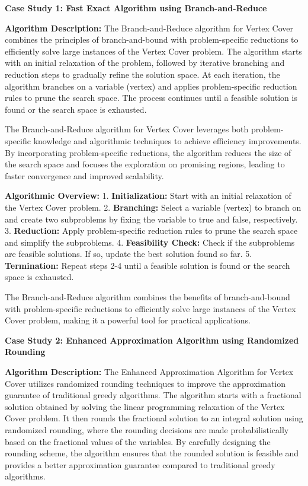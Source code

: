 \textbf{Case Study 1: Fast Exact Algorithm using Branch-and-Reduce}

\textbf{Algorithm Description:} The Branch-and-Reduce algorithm for Vertex Cover combines the principles of branch-and-bound with problem-specific reductions to efficiently solve large instances of the Vertex Cover problem. The algorithm starts with an initial relaxation of the problem, followed by iterative branching and reduction steps to gradually refine the solution space. At each iteration, the algorithm branches on a variable (vertex) and applies problem-specific reduction rules to prune the search space. The process continues until a feasible solution is found or the search space is exhausted.

The Branch-and-Reduce algorithm for Vertex Cover leverages both problem-specific knowledge and algorithmic techniques to achieve efficiency improvements. By incorporating problem-specific reductions, the algorithm reduces the size of the search space and focuses the exploration on promising regions, leading to faster convergence and improved scalability.

\textbf{Algorithmic Overview:} 
1. \textbf{Initialization:} Start with an initial relaxation of the Vertex Cover problem.
2. \textbf{Branching:} Select a variable (vertex) to branch on and create two subproblems by fixing the variable to true and false, respectively.
3. \textbf{Reduction:} Apply problem-specific reduction rules to prune the search space and simplify the subproblems.
4. \textbf{Feasibility Check:} Check if the subproblems are feasible solutions. If so, update the best solution found so far.
5. \textbf{Termination:} Repeat steps 2-4 until a feasible solution is found or the search space is exhausted.

The Branch-and-Reduce algorithm combines the benefits of branch-and-bound with problem-specific reductions to efficiently solve large instances of the Vertex Cover problem, making it a powerful tool for practical applications.



\textbf{Case Study 2: Enhanced Approximation Algorithm using Randomized Rounding}

\textbf{Algorithm Description:} The Enhanced Approximation Algorithm for Vertex Cover utilizes randomized rounding techniques to improve the approximation guarantee of traditional greedy algorithms. The algorithm starts with a fractional solution obtained by solving the linear programming relaxation of the Vertex Cover problem. It then rounds the fractional solution to an integral solution using randomized rounding, where the rounding decisions are made probabilistically based on the fractional values of the variables. By carefully designing the rounding scheme, the algorithm ensures that the rounded solution is feasible and provides a better approximation guarantee compared to traditional greedy algorithms.

